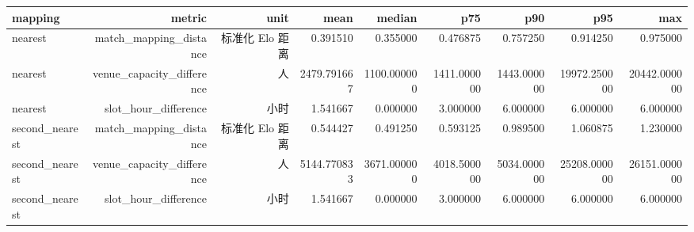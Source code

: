 \begin{tabular}{lrrrrrrrr}
\toprule
mapping & metric & unit & mean & median & p75 & p90 & p95 & max \\
\midrule
nearest & match\_mapping\_distance & 标准化 Elo 距离 & 0.391510 & 0.355000 & 0.476875 & 0.757250 & 0.914250 & 0.975000 \\
nearest & venue\_capacity\_difference & 人 & 2479.791667 & 1100.000000 & 1411.000000 & 1443.000000 & 19972.250000 & 20442.000000 \\
nearest & slot\_hour\_difference & 小时 & 1.541667 & 0.000000 & 3.000000 & 6.000000 & 6.000000 & 6.000000 \\
second\_nearest & match\_mapping\_distance & 标准化 Elo 距离 & 0.544427 & 0.491250 & 0.593125 & 0.989500 & 1.060875 & 1.230000 \\
second\_nearest & venue\_capacity\_difference & 人 & 5144.770833 & 3671.000000 & 4018.500000 & 5034.000000 & 25208.000000 & 26151.000000 \\
second\_nearest & slot\_hour\_difference & 小时 & 1.541667 & 0.000000 & 3.000000 & 6.000000 & 6.000000 & 6.000000 \\
\bottomrule
\end{tabular}
